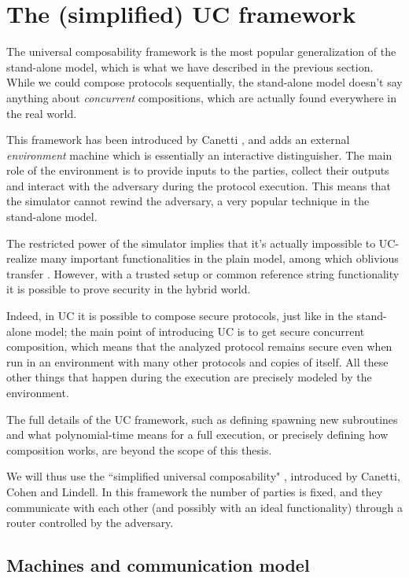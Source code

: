 \section{The (simplified) UC framework}
The universal composability framework is the most popular generalization of the stand-alone model, which is what we have described in the previous section. While we could compose protocols sequentially, the stand-alone model doesn't say anything about \emph{concurrent} compositions, which are actually found everywhere in the real world.

This framework has been introduced by Canetti \cite{Canetti_UC}, and adds an external \emph{environment} machine which is essentially an interactive distinguisher. The main role of the environment is to provide inputs to the parties, collect their outputs and interact with the adversary during the protocol execution. This means that the simulator cannot rewind the adversary, a very popular technique in the stand-alone model.

The restricted power of the simulator implies that it's actually impossible to UC-realize many important functionalities in the plain model, among which oblivious transfer \cite{Canetti_limitations}. However, with a trusted setup or common reference string functionality it is possible to prove security in the hybrid world.

Indeed, in UC it is possible to compose secure protocols, just like in the stand-alone model; the main point of introducing UC is to get secure concurrent composition, which means that the analyzed protocol remains secure even when run in an environment with many other protocols and copies of itself. All these other things that happen during the execution are precisely modeled by the environment.

The full details of the UC framework, such as defining spawning new subroutines and what polynomial-time means for a full execution, or precisely defining how composition works, are beyond the scope of this thesis.

We will thus use the ``simplified universal composability" \cite{Canetti_SUC}, introduced by Canetti, Cohen and Lindell. In this framework the number of parties is fixed, and they communicate with each other (and possibly with an ideal functionality) through a router controlled by the adversary.

\subsection{Machines and communication model}

